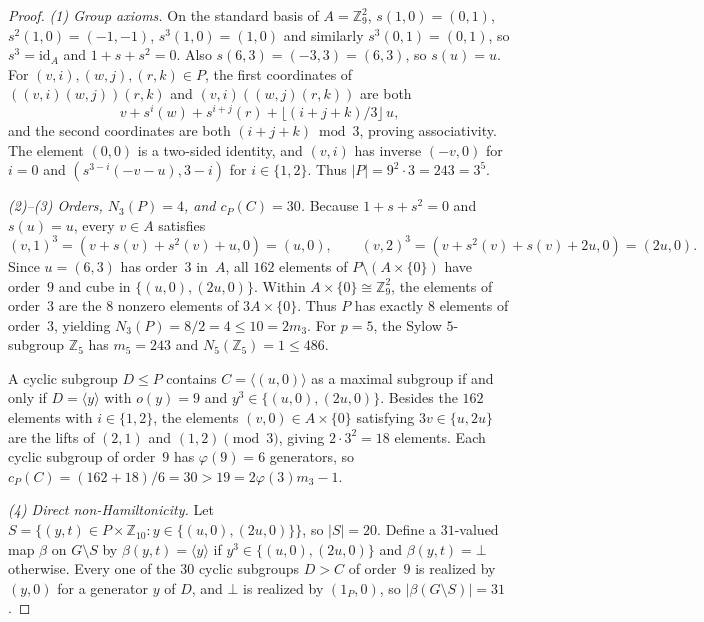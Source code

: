 \documentclass[11pt]{article}
\begin{document}
\begin{proof}
\emph{(1) Group axioms.} On the standard basis of $A = \mathbb{Z}_9^2$, $s(1, 0) = (0, 1)$, $s^2(1, 0) = (-1, -1)$, $s^3(1, 0) = (1, 0)$ and similarly $s^3(0, 1) = (0, 1)$, so $s^3 = \mathrm{id}_A$ and $1 + s + s^2 = 0$. Also $s(6, 3) = (-3, 3) = (6, 3)$, so $s(u) = u$. For $(v, i), (w, j), (r, k) \in P$, the first coordinates of $((v, i)(w, j))(r, k)$ and $(v, i)((w, j)(r, k))$ are both
\[
  v + s^i(w) + s^{i + j}(r) + \lfloor (i + j + k) / 3 \rfloor\, u,
\]
and the second coordinates are both $(i + j + k) \bmod 3$, proving associativity. The element $(0, 0)$ is a two-sided identity, and $(v, i)$ has inverse $(-v, 0)$ for $i = 0$ and $(s^{3 - i}(-v - u), 3 - i)$ for $i \in \{1, 2\}$. Thus $|P| = 9^2 \cdot 3 = 243 = 3^5$.

\emph{(2)--(3) Orders, $N_3(P) = 4$, and $c_P(C) = 30$.} Because $1 + s + s^2 = 0$ and $s(u) = u$, every $v \in A$ satisfies
\[
  (v, 1)^3 = (v + s(v) + s^2(v) + u, 0) = (u, 0), \qquad (v, 2)^3 = (v + s^2(v) + s(v) + 2u, 0) = (2u, 0).
\]
Since $u = (6, 3)$ has order~$3$ in~$A$, all $162$ elements of $P \setminus (A \times \{0\})$ have order~$9$ and cube in $\{(u, 0), (2u, 0)\}$. Within $A \times \{0\} \cong \mathbb{Z}_9^2$, the elements of order~$3$ are the $8$ nonzero elements of $3A \times \{0\}$. Thus $P$ has exactly $8$ elements of order~$3$, yielding $N_3(P) = 8 / 2 = 4 \le 10 = 2m_3$. For $p = 5$, the Sylow $5$-subgroup $\mathbb{Z}_5$ has $m_5 = 243$ and $N_5(\mathbb{Z}_5) = 1 \le 486$.

A cyclic subgroup $D \le P$ contains $C = \langle (u, 0) \rangle$ as a maximal subgroup if and only if $D = \langle y \rangle$ with $o(y) = 9$ and $y^3 \in \{(u, 0), (2u, 0)\}$. Besides the $162$ elements with $i \in \{1, 2\}$, the elements $(v, 0) \in A \times \{0\}$ satisfying $3v \in \{u, 2u\}$ are the lifts of $(2, 1)$ and $(1, 2) \pmod 3$, giving $2 \cdot 3^2 = 18$ elements. Each cyclic subgroup of order~$9$ has $\varphi(9) = 6$ generators, so $c_P(C) = (162 + 18) / 6 = 30 > 19 = 2\varphi(3)m_3 - 1$.

\emph{(4) Direct non-Hamiltonicity.} Let $S = \{(y, t) \in P \times \mathbb{Z}_{10} : y \in \{(u, 0), (2u, 0)\}\}$, so $|S| = 20$. Define a $31$-valued map $\beta$ on $G \setminus S$ by $\beta(y, t) = \langle y \rangle$ if $y^3 \in \{(u, 0), (2u, 0)\}$ and $\beta(y, t) = \bot$ otherwise. Every one of the $30$ cyclic subgroups $D > C$ of order~$9$ is realized by $(y, 0)$ for a generator $y$ of $D$, and $\bot$ is realized by $(1_P, 0)$, so $|\beta(G \setminus S)| = 31$.


\end{proof}
\end{document}
